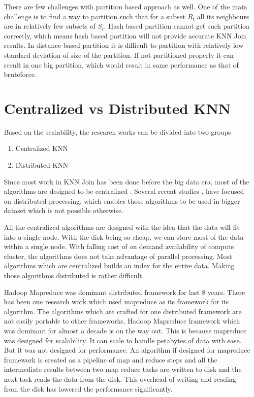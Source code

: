 \medskip

There are few challenges with partition based approach as well. One
of the main challenge is to find a way to partition such that for a subset
$R_i$ all its neighbours are in relatively few subsets of $S_i$. Hash based partition cannot
get such partition correctly, which means hash based partition will not
provide accurate KNN Join results. In distance based partition it is difficult to partition
with relatively low standard deviation of size of the partition. If
not partitioned properly it can result in one big partition, which
would result in same performance as that of bruteforce.

\bigskip


\section{Centralized vs Distributed KNN}

Based on the scalability, the research works can be divided into two
groups

\begin{enumerate}
\item Centralized KNN
\item Distributed KNN
\end{enumerate}

Since most work in KNN Join has been done before the big data era,
most of the algorithms are designed to be centralized
\cite{jagadish_idistance:_2005} \cite{xia_gorder:_2004}
\cite{bohm_k-nearest_2004} \cite{kuan_fast_1997} \cite{yu_high-dimensional_2010}.
Several recent studies \cite{stupar_rankreduceprocessing_2010},
\cite{lu_efficient_2012} have focused on distributed
processing, which enables those algorithms to be used in bigger
dataset which is not possible otherwise.

\medskip

All the centralized algorithms are designed with the idea that the
data will fit into a single node. With the disk being so cheap, we can
store most of the data within a single node. With falling cost of on
demand availability of compute cluster, the algorithms does not take
advantage of parallel processing. Most algorithms which are
centralized builds an index for the entire data. Making those
algorithms distributed is rather difficult.

\medskip

Hadoop Mapreduce was dominant distributed framework for last 8
years. There has been one research work \cite{lu_efficient_2012} which
used mapreduce as its framework for its algorithm. The algorithms
which are crafted for one distributed framework are not easily
portable to other frameworks. Hadoop Mapreduce framework which was dominant
for almost a decade is on the way out. This is
because mapreduce was designed for scalability. It can scale to handle
petabytes of data with ease. But it was not designed for
performance. An algorithm if designed for mapreduce framework is
created as a pipeline of map and reduce steps and all the
intermediate results between two map reduce tasks are written to disk
and the next task reads the data from the disk. This overhead of
writing and reading from the disk has
lowered the performance significantly.

